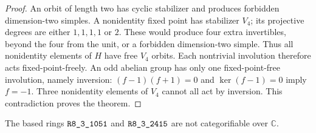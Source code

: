\begin{proof}
An orbit of length two has cyclic stabilizer and produces forbidden
dimension-two simples. A nonidentity fixed point has stabilizer $V_4$;
its projective degrees are either $1,1,1,1$ or $2$. These would produce
four extra invertibles, beyond the four from the unit, or a forbidden
dimension-two simple. Thus all nonidentity elements of $H$ have free
$V_4$ orbits. Each nontrivial involution therefore acts fixed-point-freely.
An odd abelian group has only one fixed-point-free involution, namely
inversion: $(f-1)(f+1)=0$ and $\ker(f-1)=0$ imply $f=-1$.
Three nonidentity elements of $V_4$ cannot all act by inversion.
This contradiction proves the theorem.
\end{proof}

\begin{theorem}\label{thm:m3-dimension280}
The based rings $\sha{R8_3_1051}$ and $\sha{R8_3_2415}$ are not categorifiable
over $\mathbb C$.
\end{theorem}
